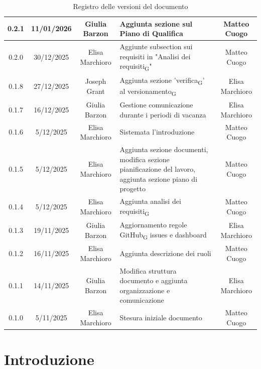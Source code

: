\documentclass[11pt,a4paper]{article}
\newcommand{\gls}[1]{#1\textsubscript{G}}
\begin{document}
\begin{table}[H]
\begin{tabular}{|c|c|c|>{\raggedright\arraybackslash}p{}|c|}
        \hline
        0.2.1 & 11/01/2026 & Giulia Barzon & Aggiunta sezione sul Piano di Qualifica & Matteo Cuogo\\
        \hline
        0.2.0 & 30/12/2025 & Elisa Marchioro & Aggiunte subsection sui requisiti in "\gls{Analisi dei requisiti}" & Matteo Cuogo\\ 
        \hline
        0.1.8 & 27/12/2025 & Joseph Grant & Aggiunta sezione '\gls{verifica}' al \gls{versionamento} & Elisa Marchioro\\ 
        \hline
        0.1.7 & 16/12/2025 & Giulia Barzon & Gestione comunicazione durante i periodi di vacanza & Elisa Marchioro\\
        \hline
        0.1.6 & 5/12/2025 & Elisa Marchioro & Sistemata l'introduzione & Matteo Cuogo\\
        \hline
        0.1.5 & 5/12/2025 & Elisa Marchioro & Aggiunta sezione documenti, modifica sezione pianificazione del lavoro, aggiunta sezione piano di progetto & Matteo Cuogo\\
        \hline
        0.1.4 & 5/12/2025 & Elisa Marchioro & Aggiunta \gls{analisi dei requisiti} & Matteo Cuogo\\
        \hline
        0.1.3 & 19/11/2025 & Giulia Barzon & Aggiornamento regole \gls{GitHub} issues e dashboard & Elisa Marchioro\\
        \hline
        0.1.2 & 16/11/2025 & Elisa Marchioro & Aggiunta descrizione dei ruoli & Matteo Cuogo\\
        \hline
        0.1.1 & 14/11/2025 & Giulia Barzon & Modifica struttura documento e aggiunta organizzazione e comunicazione & Elisa Marchioro\\
        \hline
        0.1.0 & 5/11/2025 & Elisa Marchioro & Stesura iniziale documento & Matteo Cuogo \\
        \hline
    \end{tabular}
    \caption{Registro delle versioni del documento}
    \label{tab:versionamento}
\end{table}

\newpage

\tableofcontents
\newpage

\section{Introduzione}
\end{document}
